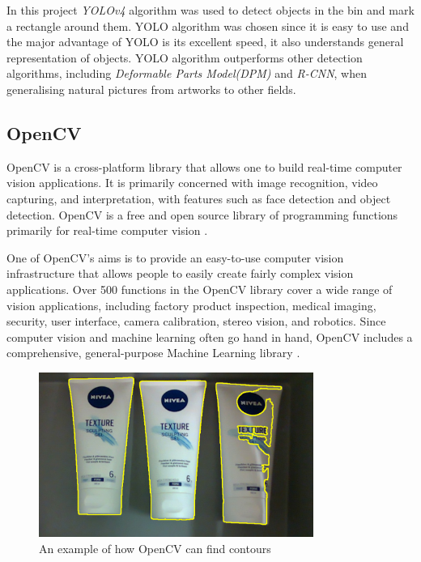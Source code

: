 In this project \textit{YOLOv4}\cite{bochkovskiy_yolov4_2020} algorithm was used to detect objects in the bin and mark a rectangle around them. 
YOLO algorithm was chosen since it is easy to use and the major advantage of YOLO is its excellent speed, it also understands general representation of objects. YOLO algorithm outperforms other detection algorithms, including \textit{Deformable Parts Model(DPM)} and \textit{R-CNN}, when generalising natural pictures from artworks to other fields.



\subsection{OpenCV}
OpenCV is a cross-platform library that allows one to build real-time computer vision applications. It is primarily concerned with image recognition, video capturing, and interpretation, with features such as face detection and object detection. OpenCV is a free and open source library of programming functions primarily for real-time computer vision \cite{noauthor_opencv_nodate}.

One of OpenCV's aims is to provide an easy-to-use computer vision infrastructure that allows people to easily create fairly complex vision applications. Over 500 functions in the OpenCV library cover a wide range of vision applications, including factory product inspection, medical imaging, security, user interface, camera calibration, stereo vision, and robotics. Since computer vision and machine learning often go hand in hand, OpenCV includes a comprehensive, general-purpose Machine Learning library \cite{kaehler_what_2016}.

\begin{figure}[h]
    \centering
    \includegraphics[width=0.8\textwidth]{graphics/contour.PNG}
    \caption{An example of how OpenCV can find contours}
    \label{fig:my_label}
\end{figure}


